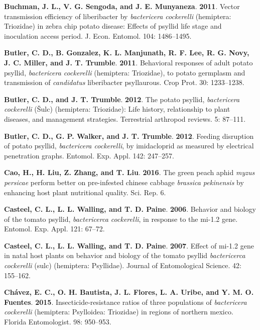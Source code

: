 \documentclass[]{article}
\begin{document}
\leavevmode\hypertarget{ref-Buchman2011a}{}%
\textbf{Buchman, J. L., V. G. Sengoda, and J. E. Munyaneza}.
\textbf{2011}. Vector transmission efficiency of liberibacter by
\emph{bactericera cockerelli} (hemiptera: Triozidae) in zebra chip
potato disease: Effects of psyllid life stage and inoculation access
period. J. Econ. Entomol. 104: 1486--1495.

\leavevmode\hypertarget{ref-Butler2011}{}%
\textbf{Butler, C. D., B. Gonzalez, K. L. Manjunath, R. F. Lee, R. G.
Novy, J. C. Miller, and J. T. Trumble}. \textbf{2011}. Behavioral
responses of adult potato psyllid, \emph{bactericera cockerelli}
(hemiptera: Triozidae), to potato germplasm and transmission of
\emph{candidatus} liberibacter psyllaurous. Crop Prot. 30: 1233--1238.

\leavevmode\hypertarget{ref-Butler2012a}{}%
\textbf{Butler, C. D., and J. T. Trumble}. \textbf{2012}. The potato
psyllid, \emph{bactericera cockerelli} (Šulc) (hemiptera: Triozidae):
Life history, relationship to plant diseases, and management strategies.
Terrestrial arthropod reviews. 5: 87--111.

\leavevmode\hypertarget{ref-Butler2012b}{}%
\textbf{Butler, C. D., G. P. Walker, and J. T. Trumble}. \textbf{2012}.
Feeding disruption of potato psyllid, \emph{bactericera cockerelli}, by
imidacloprid as measured by electrical penetration graphs. Entomol. Exp.
Appl. 142: 247--257.

\leavevmode\hypertarget{ref-Cao2016}{}%
\textbf{Cao, H., H. Liu, Z. Zhang, and T. Liu}. \textbf{2016}. The green
peach aphid \emph{myzus persicae} perform better on pre-infested chinese
cabbage \emph{brassica pekinensis} by enhancing host plant nutritional
quality. Sci. Rep. 6.

\leavevmode\hypertarget{ref-Casteel2006}{}%
\textbf{Casteel, C. L., L. L. Walling, and T. D. Paine}. \textbf{2006}.
Behavior and biology of the tomato psyllid, \emph{bactericerca
cockerelli}, in response to the mi-1.2 gene. Entomol. Exp. Appl. 121:
67--72.

\leavevmode\hypertarget{ref-Casteel2007}{}%
\textbf{Casteel, C. L., L. L. Walling, and T. D. Paine}. \textbf{2007}.
Effect of mi-1.2 gene in natal host plants on behavior and biology of
the tomato psyllid \emph{bactericerca cockerelli} (sulc) (hemiptera:
Psyllidae). Journal of Entomological Science. 42: 155--162.

\leavevmode\hypertarget{ref-Chavez2015}{}%
\textbf{Chávez, E. C., O. H. Bautista, J. L. Flores, L. A. Uribe, and Y.
M. O. Fuentes}. \textbf{2015}. Insecticide-resistance ratios of three
populations of \emph{bactericera cockerelli} (hemiptera: Psylloidea:
Triozidae) in regions of northern mexico. Florida Entomologist. 98:
950--953.
\end{document}
